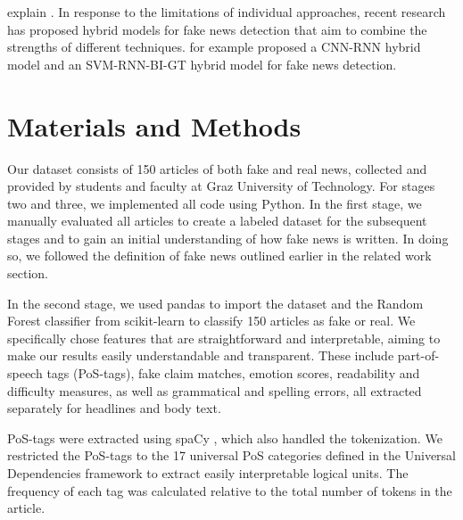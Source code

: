 \documentclass[12pt,a4paper,twocolumn]{article}
\begin{document}
explain \citep{polu2024ai, pittman2025truthtextmetaanalysismlbased}. In response to the limitations of individual approaches, recent research has proposed hybrid models for fake news detection that aim to combine the strengths of different techniques. \citet{Nasir2021Hybrid} for example proposed a CNN-RNN hybrid model and \citet{Albahar2021Hybrid} an SVM-RNN-BI-GT hybrid model for fake news detection.

\section{Materials and Methods}
\label{sec:methods}
Our dataset consists of 150 articles of both fake and real news, collected and provided by students and faculty at Graz University of Technology. For stages two and three, we implemented all code using Python. In the first stage, we manually evaluated all articles to create a labeled dataset for the subsequent stages and to gain an initial understanding of how fake news is written. In doing so, we followed the definition of fake news outlined earlier in the related work section.

In the second stage, we used pandas \citep{Pandas} to import the dataset and the Random Forest classifier from scikit-learn \citep{scikit-learn} to classify 150 articles as fake or real. We specifically chose features that are straightforward and interpretable, aiming to make our results easily understandable and transparent. These include part-of-speech tags (PoS-tags), fake claim matches, emotion scores, readability and difficulty measures, as well as grammatical and spelling errors, all extracted separately for headlines and body text.

PoS-tags were extracted using spaCy \citep{spaCy}, which also handled the tokenization. We restricted the PoS-tags to the 17 universal PoS categories defined in the Universal Dependencies framework \citep{universaldependencies} to extract easily interpretable logical units. The frequency of each tag was calculated relative to the total number of tokens in the article.
\end{document}
